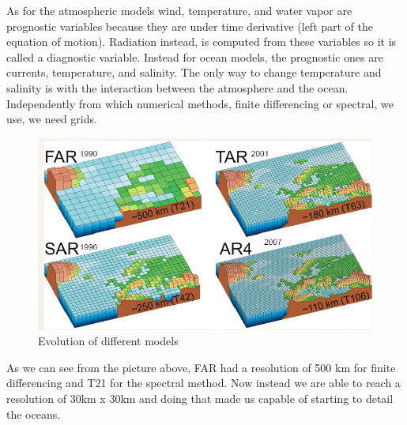 
As for the atmospheric models wind, temperature, and water vapor are prognostic variables because they are under time derivative (left part of the equation of motion). Radiation instead, is computed from these variables so it is called a diagnostic variable.
Instead for ocean models, the prognostic ones are currents, temperature, and salinity. The only way to change temperature and salinity is with the interaction between the atmosphere and the ocean. 
Independently from which numerical methods, finite differencing or spectral, we use, we need grids. 
\begin{figure}
    \centering
    \includegraphics[width=0.5\linewidth]{uploads/Screenshot 2024-11-20 213227.png}
    \caption{Evolution of different models}
    \label{fig:enter-label}
\end{figure}
As we can see from the picture above, FAR had a resolution of 500 km for finite differencing and T21 for the spectral method. Now instead we are able to reach a resolution of 30km x 30km and doing that made us capable of starting to detail the oceans. 